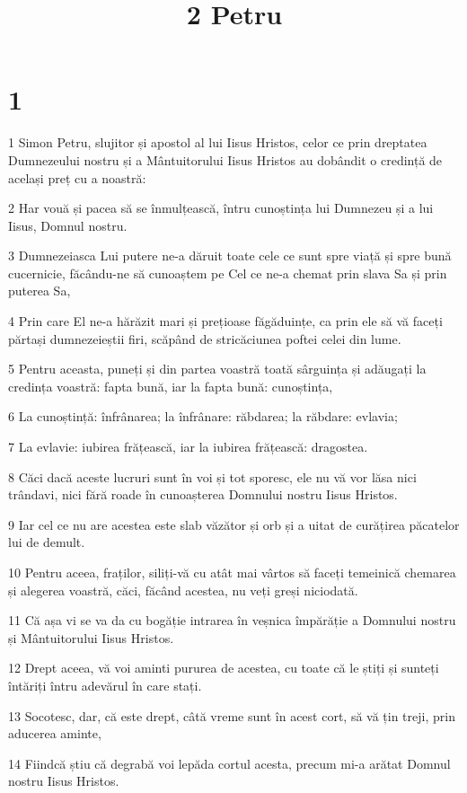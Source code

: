 

\title{2 Petru}


\chapter{1}

\par 1 Simon Petru, slujitor și apostol al lui Iisus Hristos, celor ce prin dreptatea Dumnezeului nostru și a Mântuitorului Iisus Hristos au dobândit o credință de același preț cu a noastră:
\par 2 Har vouă și pacea să se înmulțească, întru cunoștința lui Dumnezeu și a lui Iisus, Domnul nostru.
\par 3 Dumnezeiasca Lui putere ne-a dăruit toate cele ce sunt spre viață și spre bună cucernicie, făcându-ne să cunoaștem pe Cel ce ne-a chemat prin slava Sa și prin puterea Sa,
\par 4 Prin care El ne-a hărăzit mari și prețioase făgăduințe, ca prin ele să vă faceți părtași dumnezeieștii firi, scăpând de stricăciunea poftei celei din lume.
\par 5 Pentru aceasta, puneți și din partea voastră toată sârguința și adăugați la credința voastră: fapta bună, iar la fapta bună: cunoștința,
\par 6 La cunoștință: înfrânarea; la înfrânare: răbdarea; la răbdare: evlavia;
\par 7 La evlavie: iubirea frățească, iar la iubirea frățească: dragostea.
\par 8 Căci dacă aceste lucruri sunt în voi și tot sporesc, ele nu vă vor lăsa nici trândavi, nici fără roade în cunoașterea Domnului nostru Iisus Hristos.
\par 9 Iar cel ce nu are acestea este slab văzător și orb și a uitat de curățirea păcatelor lui de demult.
\par 10 Pentru aceea, fraților, siliți-vă cu atât mai vârtos să faceți temeinică chemarea și alegerea voastră, căci, făcând acestea, nu veți greși niciodată.
\par 11 Că așa vi se va da cu bogăție intrarea în veșnica împărăție a Domnului nostru și Mântuitorului Iisus Hristos.
\par 12 Drept aceea, vă voi aminti pururea de acestea, cu toate că le știți și sunteți întăriți întru adevărul în care stați.
\par 13 Socotesc, dar, că este drept, câtă vreme sunt în acest cort, să vă țin treji, prin aducerea aminte,
\par 14 Fiindcă știu că degrabă voi lepăda cortul acesta, precum mi-a arătat Domnul nostru Iisus Hristos.
